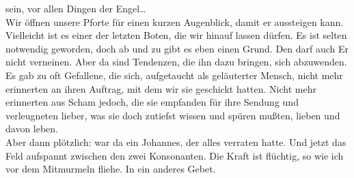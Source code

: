 \documentclass[
]{article}
\begin{document}
sein, vor allen Dingen der Engel\ldots{}\\
Wir öffnen unsere Pforte für einen kurzen Augenblick, damit er
aussteigen kann. Vielleicht ist es einer der letzten Boten, die wir
hinauf lassen dürfen. Es ist selten notwendig geworden, doch ab und zu
gibt es eben einen Grund. Den darf auch Er nicht verneinen. Aber da sind
Tendenzen, die ihn dazu bringen, sich abzuwenden. Es gab zu oft
Gefallene, die sich, aufgetaucht als geläuterter Mensch, nicht mehr
erinnerten an ihren Auftrag, mit dem wir sie geschickt hatten. Nicht
mehr erinnerten aus Scham jedoch, die sie empfanden für ihre Sendung und
verleugneten lieber, was sie doch zutiefst wissen und spüren mußten,
lieben und davon leben.\\
Aber dann plötzlich: war da ein Johannes, der alles verraten hatte. Und
jetzt das Feld aufspannt zwischen den zwei Konsonanten. Die Kraft ist
flüchtig, so wie ich vor dem Mitmurmeln fliehe. In ein anderes Gebet.
\end{document}
